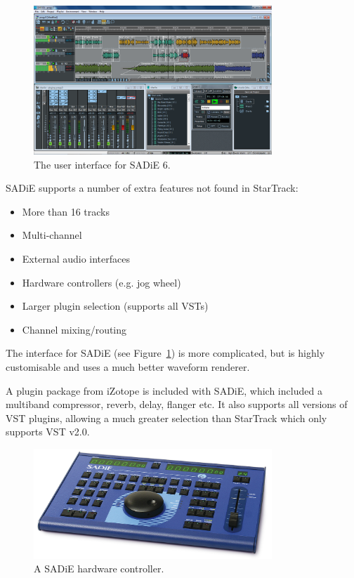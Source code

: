 \begin{figure}[p]
\centering
\includegraphics[width=0.8\textwidth]{figs/sadie.png}
\caption{The user interface for SADiE 6.}
\label{fig:sadie}
\end{figure}

SADiE supports a number of extra features not found in StarTrack:
\begin{itemize}
  \item More than 16 tracks
  \item Multi-channel
  \item External audio interfaces
  \item Hardware controllers (e.g. jog wheel)
  \item Larger plugin selection (supports all VSTs)
  \item Channel mixing/routing
\end{itemize}

The interface for SADiE (see Figure~\ref{fig:sadie}) is more complicated, but
is highly customisable and uses a much better waveform renderer.

A plugin package from iZotope is included with SADiE, which included a
multiband compressor, reverb, delay, flanger etc. It also supports all versions
of VST plugins, allowing a much greater selection than StarTrack which only
supports VST v2.0.

\begin{figure}[p]
\centering
\includegraphics[width=0.8\textwidth]{figs/sadie-controller.jpg}
\caption{A SADiE hardware controller.}
\label{fig:sadie-controller}
\end{figure}

